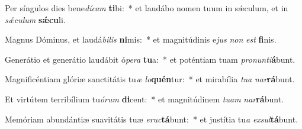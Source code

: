 \item Per síngulos dies bene\textit{dí}\textit{cam} \textbf{ti}bi:~* et laudábo nomen tuum in sǽculum, et in \textit{sǽ}\textit{cu}\textit{lum} \textbf{sǽ}\textbf{cu}li.
\item Magnus Dóminus, et laudá\textit{bi}\textit{lis} \textbf{ni}mis:~* et magnitúdinis e\textit{jus} \textit{non} \textit{est} \textbf{fi}nis.
\item Generátio et generátio laudábit ó\textit{pe}\textit{ra} \textbf{tu}a:~* et poténtiam tuam \textit{pro}\textit{nun}\textit{ti}\textbf{á}bunt.
\item Magnificéntiam glóriæ sanctitátis tu\textit{æ} \textit{lo}\textbf{quén}tur:~* et mirabília \textit{tu}\textit{a} \textit{nar}\textbf{rá}bunt.
\item Et virtútem terribílium tu\textit{ó}\textit{rum} \textbf{di}cent:~* et magnitúdinem \textit{tu}\textit{am} \textit{nar}\textbf{rá}bunt.
\item Memóriam abundántiæ suavitátis tuæ \textit{e}\textit{ruc}\textbf{tá}bunt:~* et justítia tu\textit{a} \textit{ex}\textit{sul}\textbf{tá}bunt.
